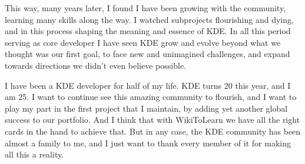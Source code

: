 This way, many years later, I found I have been growing with the community, learning many skills along the way. I watched subprojects flourishing and dying, and in this process shaping the meaning and essence of KDE. In all this period serving as core developer I have seen KDE grow and evolve beyond what we thought was our first goal, to face new and unimagined challenges, and expand towards directions we didn't even believe possible.

I have been a KDE developer for half of my life. KDE turns 20 this year, and I am 25. I want to continue see this amazing community to flourish, and I want to play my part in the first project that I maintain, by adding yet another global success to our portfolio. And I think that with WikiToLearn we have all the right cards in the hand to achieve that.
But in any case, the KDE community has been almost a family to me, and I just want to thank every member of it for making all this a reality.
